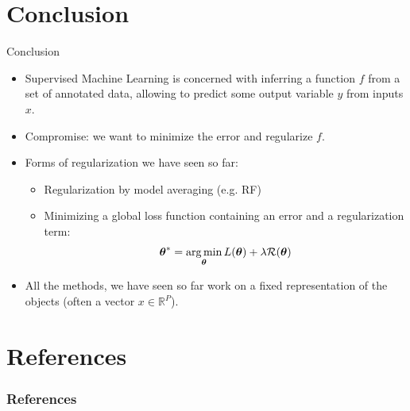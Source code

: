 \documentclass[xcolor=pdftex,dvipsnames,table]{beamer}
\begin{document}
\section{Conclusion}
\begin{frame}{Conclusion}
	\begin{itemize}
		\item Supervised Machine Learning is concerned with inferring a function $f$ from a set of annotated data, allowing to predict some output variable $y$ from inputs $x$.
		\item Compromise: we want to minimize the error and regularize $f$.
		\item Forms of regularization we have seen so far:
			\begin{itemize}
				\item Regularization by model averaging (e.g. RF)
				\item Minimizing a global loss function containing an error and a regularization term:
				\begin{equation*}
					\boldsymbol{\theta} ^{\ast} = \operatorname*{arg\,min}_{\boldsymbol{\theta}} L (\boldsymbol{\theta}) + \lambda \mathcal{R}(\boldsymbol{\theta})
				\end{equation*}
			\end{itemize}
		\item All the methods, we have seen so far work on a fixed representation of the objects (often a vector $x \in\mathbb{R}^P$).
	\end{itemize}
\end{frame}

\section{References}
\begin{frame}[allowframebreaks]
	\frametitle{References}
	
\end{frame}
\end{document}
